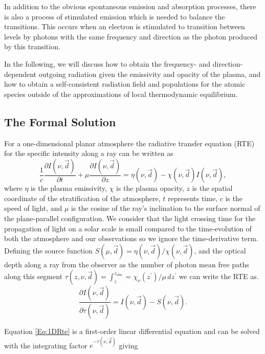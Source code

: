In addition to the obvious spontaneous emission and absorption processes, there is also a process of stimulated emission which is needed to balance the transitions. This occurs when an electron is stimulated to transition between levels by photons with the same frequency and direction as the photon produced by this transition.

In the following, we will discuss how to obtain the frequency- and direction-dependent outgoing radiation given the emissivity and opacity of the plasma, and how to obtain a self-consistent radiation field and populations for the atomic species outside of the approximations of local thermodynamic equilibrium.

\subsection{The Formal Solution}

For a one-dimensional planar atmosphere the radiative transfer equation (RTE) for the specific intensity along a ray can be written as
\begin{equation}
    \frac{1}{c}\frac{\partial I(\nu, \vec{d})}{\partial t} + \mu \frac{\partial I(\nu, \vec{d})}{\partial z} = \eta(\nu, \vec{d}) - \chi(\nu, \vec{d})I(\nu, \vec{d}),
    \label{Eq:FullTimeDepRte}
\end{equation}
where $\eta$ is the plasma emissivity, $\chi$ is the plasma opacity, $z$ is the spatial coordinate of the stratification of the atmosphere, $t$ represents time, $c$ is the speed of light, and $\mu$ is the cosine of the ray's inclination to the surface normal of the plane-parallel configuration.
We consider that the light crossing time for the propagation of light on a solar scale is small compared to the time-evolution of both the atmosphere and our observations so we ignore the time-derivative term.
Defining the source function $S(\mu, \vec{d}) = \eta(\nu, \vec{d}) / \chi(\nu, \vec{d})$, and the optical depth along a ray from the observer as the number of photon mean free paths along this segment $\tau(z, \nu, \vec{d}) = \int_z^{z_{\mathrm{obs}}} = \chi_\nu(z^\prime) / \mu\, dz^\prime$ we can write the RTE as.
\begin{equation}
    \frac{\partial I(\nu, \vec{d})}{\partial \tau(\nu, \vec{d})} = I(\nu, \vec{d}) - S(\nu, \vec{d}).
    \label{Eq:1DRte}
\end{equation}

Equation \eqref{Eq:1DRte} is a first-order linear differential equation and can be solved with the integrating factor $e^{-\tau(\nu, \vec{d})}$ giving

